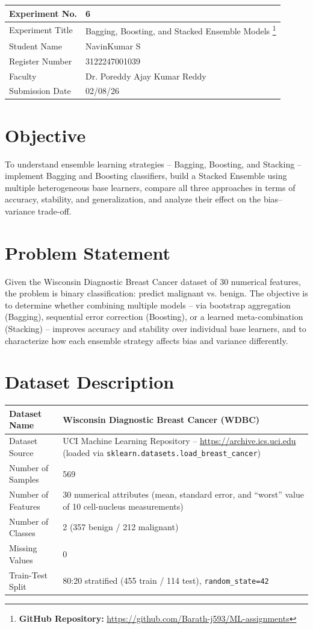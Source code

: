 \documentclass[12pt,a4paper]{article}
\begin{document}
\begin{tabular}{|p{4cm}|p{11cm}|}
\hline
Experiment No. & 6\\ \hline
Experiment Title & Bagging, Boosting, and Stacked Ensemble Models
\footnote{\textbf{GitHub Repository: }\url{https://github.com/Barath-j593/ML-assignments}}\\ \hline

Student Name & NavinKumar S \\ \hline
Register Number & 3122247001039 \\ \hline
Faculty & Dr. Poreddy Ajay Kumar Reddy \\ \hline
Submission Date & 02/08/26 \\ \hline
\end{tabular}

\section{Objective}
To understand ensemble learning strategies -- Bagging, Boosting, and Stacking -- implement
Bagging and Boosting classifiers, build a Stacked Ensemble using multiple heterogeneous base
learners, compare all three approaches in terms of accuracy, stability, and generalization,
and analyze their effect on the bias--variance trade-off.

\section{Problem Statement}
Given the Wisconsin Diagnostic Breast Cancer dataset of 30 numerical features, the problem is
binary classification: predict malignant vs. benign. The objective is to determine whether
combining multiple models -- via bootstrap aggregation (Bagging), sequential error correction
(Boosting), or a learned meta-combination (Stacking) -- improves accuracy and stability over
individual base learners, and to characterize how each ensemble strategy affects bias and
variance differently.

\section{Dataset Description}
\begin{longtable}{|p{6cm}|p{8cm}|}
\hline
Dataset Name & Wisconsin Diagnostic Breast Cancer (WDBC) \\ \hline
Dataset Source & UCI Machine Learning Repository -- \url{https://archive.ics.uci.edu} (loaded via \texttt{sklearn.datasets.load\_breast\_cancer}) \\ \hline
Number of Samples & 569 \\ \hline
Number of Features & 30 numerical attributes (mean, standard error, and ``worst'' value of 10 cell-nucleus measurements) \\ \hline
Number of Classes & 2 (357 benign / 212 malignant) \\ \hline
Missing Values & 0 \\ \hline
Train-Test Split & 80:20 stratified (455 train / 114 test), \texttt{random\_state=42} \\ \hline
\end{longtable}
\end{document}
